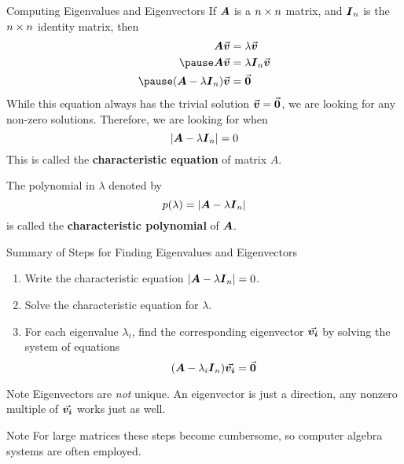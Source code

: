 \documentclass{beamer}
\begin{document}
\begin{frame}
\begin{block}{Computing Eigenvalues and Eigenvectors}
If $\boldsymbol{A}$ is a $n\times n$ matrix, and $\boldsymbol{I}_{n}$ is the $n\times n$ identity matrix, then 
\begin{equation*}
\begin{aligned}
\mat{A}\vect{v}&=\lambda\vect{v}\\\pause
\mat{A}\vect{v}&=\lambda\identmat{n}\vect{v}\\\pause
(\mat{A}-\lambda\identmat{n})\vect{v}&=\vect{0}
\end{aligned}
\end{equation*}\pause
While this equation always has the trivial solution ${\vec{\boldsymbol{v}}}={\vec{\boldsymbol{0}}}$, we are looking for any non-zero solutions. Therefore, we are looking for when
\begin{equation*}
{\left\lvert \boldsymbol{A}-\lambda\boldsymbol{I}_{n}\right\rvert}=0
\end{equation*}\pause
This is called the \textbf{characteristic equation} of matrix $A$.\pause

\vspace{2mm} The polynomial in $\lambda$ denoted by 
\begin{equation*}
p(\lambda)={\left\lvert \boldsymbol{A}-\lambda\boldsymbol{I}_{n}\right\rvert}
\end{equation*}
is called the \textbf{characteristic polynomial} of $\boldsymbol{A}$.
\end{block}
\end{frame}

\begin{frame}
\begin{block}{Summary of Steps for Finding Eigenvalues and Eigenvectors}
\begin{enumerate}
\item Write the characteristic equation ${\left\lvert \boldsymbol{A}-\lambda\boldsymbol{I}_{n}\right\rvert}=0$.
\item Solve the characteristic equation for $\lambda$.
\item For each eigenvalue $\lambda_i$, find the corresponding eigenvector ${\vec{\boldsymbol{v_i}}}$ by solving the system of equations 
\begin{equation*}
(\boldsymbol{A}-\lambda_i\boldsymbol{I}_{n}){\vec{\boldsymbol{v_i}}}={\vec{\boldsymbol{0}}}
\end{equation*}
\end{enumerate}
\end{block}\pause
\begin{block}{Note}
Eigenvectors are \emph{not} unique. An eigenvector is just a direction, any nonzero multiple of ${\vec{\boldsymbol{v_i}}}$ works just as well.
\end{block}\pause
\begin{block}{Note}
For large matrices these steps become cumbersome, so computer algebra systems are often employed.
\end{block}
\end{frame}
\end{document}
